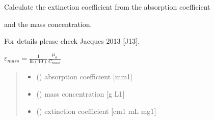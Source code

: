 \documentclass[letterpaper,10pt,english]{sphinxmanual}
\begin{document}

\begin{fulllineitems}
\label{\detokenize{03_absorption_coefficient:skinoptics.absorption_coefficient.ext_from_mua_and_Cmass}}
\pysigstartsignatures
{}
\pysigstopsignatures
\begin{DUlineblock}{0em}
\item[] Calculate the extinction coefficient from the absorption coefficient
\item[] and the mass concentration.
\item[] For details please check Jacques 2013 {[}J13{]}.
\end{DUlineblock}

\sphinxAtStartPar
\(\varepsilon_{mass} = \frac{1}{\mbox{ln}(10)}\frac{\mu_a}{C_{mass}}\)
\begin{quote}\begin{description}
\begin{itemize}
\item {} 
\sphinxAtStartPar
{} () \textendash{} absorption coefficient {[}mm\sphinxhyphen{}1{]}

\item {} 
\sphinxAtStartPar
{} () \textendash{} mass concentration {[}g L\sphinxhyphen{}1{]}

\end{itemize}

\sphinxAtStartPar
\begin{itemize}
\item {} 
\sphinxAtStartPar
{} () \textendash{} extinction coefficient {[}cm\sphinxhyphen{}1 mL mg\sphinxhyphen{}1{]}

\end{itemize}


\end{description}\end{quote}

\end{fulllineitems}
\end{document}
